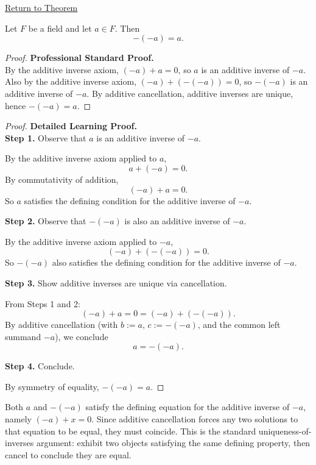 \newpage
{}
\label{prf:double-negation}

\begin{remark*}[Return]
\hyperref[thm:double-negation]{Return to Theorem}
\end{remark*}

\begin{theorem*}
Let $F$ be a field and let $a\in F$.  Then
\[
-(-a) = a.
\]
\end{theorem*}

\begin{proof}
\textbf{Professional Standard Proof.}~\\
By the additive inverse axiom, $(-a) + a = 0$, so $a$ is an additive
inverse of $-a$.  Also by the additive inverse axiom, $(-a) + (-(-a)) = 0$,
so $-(-a)$ is an additive inverse of $-a$.  By additive cancellation,
additive inverses are unique, hence $-(-a) = a$.
\end{proof}

\begin{proof}
\textbf{Detailed Learning Proof.}~\\

\textbf{Step 1.} Observe that $a$ is an additive inverse of $-a$.

By the additive inverse axiom applied to $a$,
\[
a + (-a) = 0.
\]
By commutativity of addition,
\[
(-a) + a = 0.
\]
So $a$ satisfies the defining condition for the additive inverse of $-a$.

\textbf{Step 2.} Observe that $-(-a)$ is also an additive inverse of $-a$.

By the additive inverse axiom applied to $-a$,
\[
(-a) + (-(-a)) = 0.
\]
So $-(-a)$ also satisfies the defining condition for the additive inverse of $-a$.

\textbf{Step 3.} Show additive inverses are unique via cancellation.

From Steps 1 and 2:
\[
(-a) + a = 0 = (-a) + (-(-a)).
\]
By additive cancellation (with $b := a$, $c := -(-a)$, and the common
left summand $-a$), we conclude
\[
a = -(-a).
\]

\textbf{Step 4.} Conclude.

By symmetry of equality, $-(-a) = a$.
\end{proof}

\begin{remark*}
Both $a$ and $-(-a)$ satisfy the defining equation for the additive inverse
of $-a$, namely $(-a) + x = 0$.  Since additive cancellation forces any two
solutions to that equation to be equal, they must coincide.  This is the
standard uniqueness-of-inverses argument: exhibit two objects satisfying the
same defining property, then cancel to conclude they are equal.
\end{remark*}

